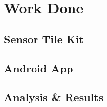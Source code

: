 \chapter{Work Done}


\section{Sensor Tile Kit}
\lipsum[1]

\section{Android App}
\lipsum[1]

\section{Analysis \& Results}
\lipsum[1]
